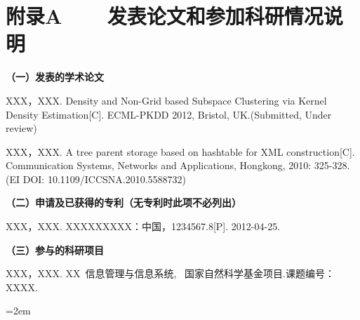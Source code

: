 
\chapter*{附录A~~~~发表论文和参加科研情况说明}
\setlength{\parindent}{0em}
\textbf{（一）发表的学术论文}
\begin{publist}
\item XXX，XXX. Density and Non-Grid based Subspace Clustering via Kernel Density Estimation[C]. ECML-PKDD 2012, Bristol, UK.(Submitted, Under review)
\item XXX，XXX. A tree parent storage based on hashtable for XML construction[C]. Communication Systems, Networks and Applications, Hongkong, 2010: 325-328. (EI DOI: 10.1109/ICCSNA.2010.5588732)
\end{publist}

\vspace*{1em}
\textbf{（二）申请及已获得的专利（无专利时此项不必列出）}
\begin{publist}
\item XXX，XXX. XXXXXXXXX：中国，1234567.8[P]. 2012-04-25.
\end{publist}
\vspace*{1em}
\textbf{（三）参与的科研项目}
\begin{publist}
\item	XXX，XXX. XX~信息管理与信息系统, ~国家自然科学基金项目.课题编号：XXXX.
\end{publist}
\vfill
{}\hangindent=2em\noindent

\setlength{\parindent}{2em}
